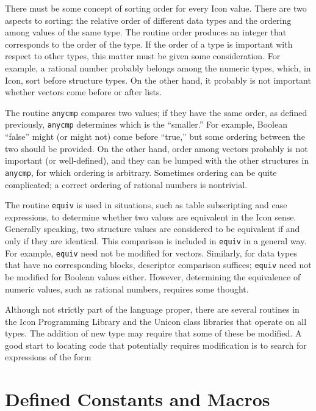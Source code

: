 There must be some concept of sorting order for every Icon
value. There are two aspects to sorting: the relative order of
different data types and the ordering among values of the same
type. The routine order produces an integer that corresponds to the
order of the type. If the order of a type is important with respect to
other types, this matter must be given some consideration. For
example, a rational number probably belongs among the numeric types,
which, in Icon, sort before structure types. On the other hand, it
probably is not important whether vectors come before or after lists.


The routine \texttt{anycmp} compares two values; if they have the same
order, as defined previously, \texttt{anycmp} determines which is the
``smaller.''  For example, Boolean ``false'' might (or might not) come
before ``true,'' but some ordering between the two should be provided.
On the other hand, order among vectors probably is not important (or
well-defined), and they can be lumped with the other structures in
\texttt{anycmp}, for which ordering is arbitrary. Sometimes ordering can be
quite complicated; a correct ordering of rational numbers is nontrivial.


The routine \texttt{equiv} is used in situations, such as table
subscripting and case expressions, to determine whether two values are
equivalent in the Icon sense. Generally speaking, two structure values are
considered to be equivalent if and only if they are identical. This
comparison is included in \texttt{equiv} in a general way. For example,
\texttt{equiv} need not be modified for vectors. Similarly, for data types
that have no corresponding blocks, descriptor comparison suffices;
\texttt{equiv} need not be modified for Boolean values either. However,
determining the equivalence of numeric values, such as rational numbers,
requires some thought.

Although not strictly part of the language proper, there are several
routines in the Icon Programming Library and the Unicon class libraries
that operate on all types. The addition of new type may require that some
of these be modified. A good start to locating code that potentially
requires modification is to search for expressions of the form

\section{Defined Constants and Macros}

